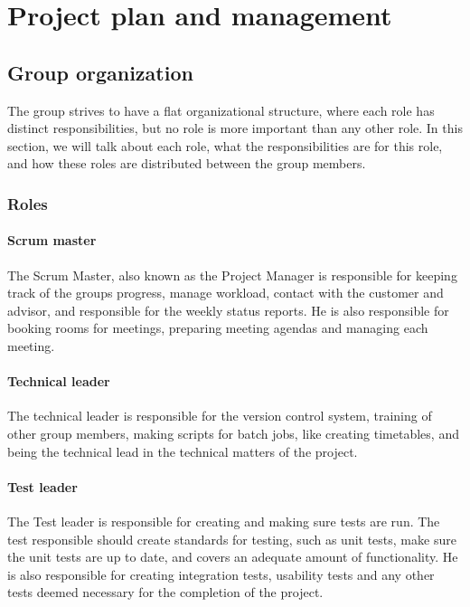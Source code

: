 \section{Project plan and management}


\subsection{Group organization}
The group strives to have a flat organizational structure, where each role has
distinct responsibilities, but no role is more important than any other role. In
this section, we will talk about each role, what the responsibilities are for
this role, and how these roles are distributed between the group members.

\subsubsection{Roles}
\paragraph{\textbf{Scrum master}}
The Scrum Master, also known as the Project Manager is responsible for keeping
track of the groups progress, manage workload, contact with the customer and
advisor, and responsible for the weekly status reports. He is also responsible
for booking rooms for meetings, preparing meeting agendas and managing each
meeting.

\paragraph{\textbf{Technical leader}}
The technical leader is responsible for the version control system,
training of other group members, making scripts for batch jobs, like creating
timetables, and being the technical lead in the technical matters of the
project.

\paragraph{\textbf{Test leader}}
The Test leader is responsible for creating and making sure tests are run. The
test responsible should create standards for testing, such as unit tests, make
sure the unit tests are up to date, and covers an adequate amount of
functionality. He is also responsible for creating integration tests, usability
tests and any other tests deemed necessary for the completion of the project.

